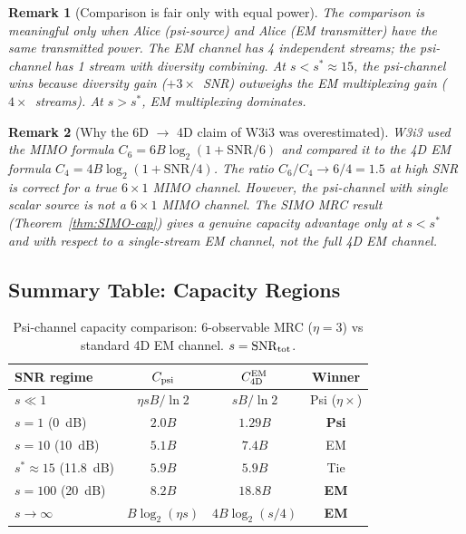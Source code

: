 \documentclass[aps,prd,twocolumn,superscriptaddress,nofootinbib]{revtex4-2}
\newcommand{\SNR}{\mathrm{SNR}}
\newtheorem{remark}{Remark}
\begin{document}
\begin{remark}[Comparison is fair only with equal power]
The comparison is meaningful only when Alice (psi-source) and Alice (EM
transmitter) have the same transmitted power. The EM channel has 4
independent streams; the psi-channel has 1 stream with diversity combining.
At $s < s^* \approx 15$, the psi-channel wins because diversity gain
($+3\times$~SNR) outweighs the EM multiplexing gain ($4\times$~streams).
At $s > s^*$, EM multiplexing dominates.
\end{remark}

\begin{remark}[Why the 6D $\to$ 4D claim of W3i3 was overestimated]
W3i3 used the MIMO formula $C_6 = 6B\log_2(1 + \SNR/6)$ and compared
it to the 4D EM formula $C_4 = 4B\log_2(1 + \SNR/4)$. The ratio
$C_6/C_4 \to 6/4 = 1.5$ at high SNR is correct for a true $6\times 1$
MIMO channel. However, the psi-channel with single scalar source is not
a $6\times 1$ MIMO channel. The SIMO MRC result (Theorem~\ref{thm:SIMO-cap})
gives a genuine capacity advantage only at $s < s^*$ and with respect
to a \emph{single-stream} EM channel, not the full 4D EM channel.
\end{remark}

\subsection{Summary Table: Capacity Regions}

\begin{table}[h]
\centering
\caption{Psi-channel capacity comparison: 6-observable MRC ($\eta=3$) vs
standard 4D EM channel. $s = \SNR_{\rm tot}$.}
\begin{tabular}{lccc}
\hline\hline
SNR regime & $C_{\rm psi}$ & $C_{\rm 4D}^{\rm EM}$ & Winner \\
\hline
$s \ll 1$ & $\eta s B/\ln 2$ & $s B/\ln 2$ & Psi ($\eta\times$) \\
$s = 1$ (0~dB) & $2.0 B$ & $1.29 B$ & \textbf{Psi} \\
$s = 10$ (10~dB) & $5.1 B$ & $7.4 B$ & EM \\
$s^* \approx 15$ (11.8~dB) & $5.9 B$ & $5.9 B$ & Tie \\
$s = 100$ (20~dB) & $8.2 B$ & $18.8 B$ & \textbf{EM} \\
$s \to\infty$ & $B\log_2(\eta s)$ & $4B\log_2(s/4)$ & \textbf{EM} \\
\hline\hline
\end{tabular}
\label{tab:cap-comparison}
\end{table}
\end{document}
